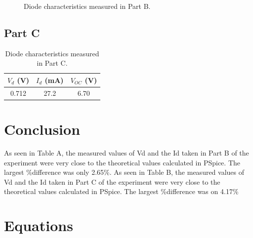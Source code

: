 \documentclass{article}
\begin{document}
\begin{figure}[hbtp]
  \centering
  
  \caption{\label{fig:part_b_graph} Diode characteristics measured in Part B.}
\end{figure}

\subsection{Part C}
\label{sec:result_c}

\begin{table}[hbtp]
  \centering
  \begin{tabular}{ccc}
    $V_d$ (\si{V}) & $I_d$ (\si{mA}) & $V_{OC}$ (\si{V}) \\
    \hline
    0.712 & 27.2 & 6.70 \\
  \end{tabular}
  \caption{\label{tab:part_c} Diode characteristics measured in Part C.}
\end{table}

\section{Conclusion}
\label{sec:conclusion}

As seen in Table A, the measured values of Vd and the Id taken in Part
B of the experiment were very close to the theoretical values
calculated in PSpice. The largest \%difference was only 2.65\%.  As seen
in Table B, the measured values of Vd and the Id taken in Part C of
the experiment were very close to the theoretical values calculated in
PSpice. The largest \%difference was on 4.17\%

\section{Equations}
\label{sec:equations}
\end{document}
